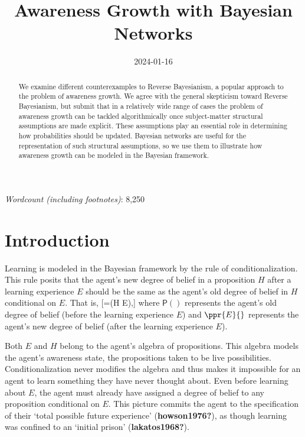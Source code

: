 \documentclass[
  letterpaper,
  DIV=11,
  numbers=noendperiod]{scrartcl}
\title{Awareness Growth with Bayesian Networks}
\author{}
\date{2024-01-16}
\newcommand{\pr}[1]{\mathsf{P}(#1)}
\renewcommand*\contentsname{Table of contents}
\newcommand\contentsname{Table of contents}
\begin{document}
\maketitle
\ifdefined\Shaded\renewenvironment{Shaded}{\begin{tcolorbox}[sharp corners, enhanced, interior hidden, breakable, frame hidden, boxrule=0pt, borderline west={3pt}{0pt}{shadecolor}]}{\end{tcolorbox}}\fi

\renewcommand*\contentsname{Table of contents}
{
\hypersetup{linkcolor=}
\setcounter{tocdepth}{3}
\tableofcontents
}
\doublespace

\emph{Wordcount (including footnotes)}: 8,250

\begin{abstract}
We examine different counterexamples to Reverse Bayesianism, a popular approach to the problem of awareness growth. We agree with the general skepticism toward Reverse Bayesianism, but submit that in a relatively wide range of cases the problem of awareness growth  can be tackled algorithmically once subject-matter structural assumptions are made explicit. These assumptions play an essential role in determining how probabilities should be updated. Bayesian networks are useful for the representation of such structural assumptions, so we use them to illustrate how awareness growth can be modeled in the Bayesian framework. 
\end{abstract}

\doublespace

\hypertarget{introduction}{%
\section{Introduction}\label{introduction}}

Learning is modeled in the Bayesian framework by the rule of
conditionalization. This rule posits that the agent's new degree of
belief in a proposition \(H\) after a learning experience \(E\) should
be the same as the agent's old degree of belief in \(H\) conditional on
\(E\). That is, {[}=\pr{H \vert E},{]} where \(\pr{}\)
represents the agent's old degree of belief (before the learning
experience \(E\)) and \(\ppr{E}{}\) represents the agent's new degree of
belief (after the learning experience \(E\)).

Both \(E\) and \(H\) belong to the agent's algebra of propositions. This
algebra models the agent's awareness state, the propositions taken to be
live possibilities. Conditionalization never modifies the algebra and
thus makes it impossible for an agent to learn something they have never
thought about. Even before learning about \(E\), the agent must already
have assigned a degree of belief to any proposition conditional on
\(E\). This picture commits the agent to the specification of their
`total possible future experience' (\textbf{howson1976?}), as though
learning was confined to an `initial prison' (\textbf{lakatos1968?}).
\end{document}

